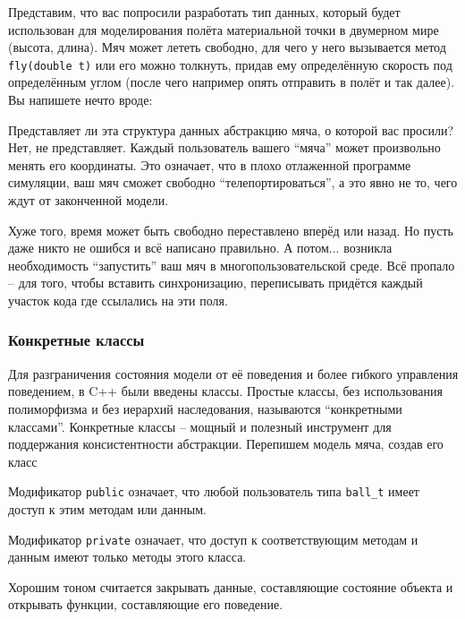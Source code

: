 \documentclass[a4paper,12pt,oneside]{article}
\begin{document}
Представим, что вас попросили разработать тип данных, который будет использован для моделирования полёта материальной точки в двумерном мире (высота, длина). Мяч может лететь свободно, для чего у него вызывается метод \lstinline!fly(double t)! или его можно толкнуть, придав ему определённую скорость под определённым углом (после чего например опять отправить в полёт и так далее). Вы напишете нечто вроде:



Представляет ли эта структура данных абстракцию мяча, о которой вас просили? Нет, не представляет. Каждый пользователь вашего ``мяча'' может произвольно менять его координаты. Это означает, что в плохо отлаженной программе симуляции, ваш мяч сможет свободно ``телепортироваться'', а это явно не то, чего ждут от законченной модели. 



Хуже того, время может быть свободно переставлено вперёд или назад. Но пусть даже никто не ошибся и всё написано правильно. А потом... возникла необходимость ``запустить'' ваш мяч в многопользовательской среде. Всё пропало – для того, чтобы вставить синхронизацию, переписывать придётся каждый участок кода где ссылались на эти поля.

\subsubsection{Конкретные классы}

Для разграничения состояния модели от её поведения и более гибкого управления поведением, в C++ были введены классы. Простые классы, без использования полиморфизма и без иерархий наследования, называются ``конкретными классами''. Конкретные классы -- мощный и полезный инструмент для поддержания консистентности абстракции. Перепишем модель мяча, создав его класс



Модификатор \lstinline!public! означает, что любой пользователь типа \lstinline!ball_t! имеет доступ к этим методам или данным. 

Модификатор \lstinline!private! означает, что доступ к соответствующим методам и данным имеют только методы этого класса.



Хорошим тоном считается закрывать данные, составляющие состояние объекта и открывать функции, составляющие его поведение.
\end{document}
